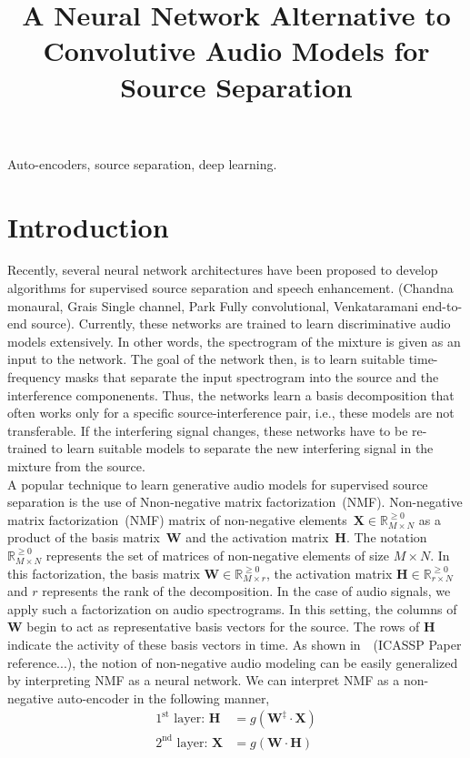 \documentclass{article}
\title{A Neural Network Alternative to Convolutive Audio Models for Source Separation}
\begin{document}
%

\maketitle
%
\begin{abstract}
\end{abstract}
%
\begin{keywords}
Auto-encoders, source separation, deep learning.
\end{keywords}
%
\section{Introduction}
\label{sec:intro}
Recently, several neural network architectures have been proposed to develop algorithms for supervised source separation and speech enhancement. (Chandna monaural, Grais Single channel, Park Fully convolutional, Venkataramani end-to-end source). Currently, these networks are trained to learn discriminative audio models extensively. In other words, the spectrogram of the mixture is given as an input to the network. The goal of the network then, is to learn suitable time-frequency masks that separate the input spectrogram into the source and the interference componenents. Thus, the networks learn a basis decomposition that often works only for a specific source-interference pair, i.e., these models are not transferable. If the interfering signal changes, these networks have to be re-trained to learn suitable models to separate the new interfering signal in the mixture from the source. \\

A popular technique to learn generative audio models for supervised source separation is the use of Nnon-negative matrix factorization~(NMF). Non-negative matrix factorization~(NMF) matrix of non-negative elements~$\mathbf{X}\in \mathbb{R}_{M\times N}^{\geq0}$ as a product of the basis matrix~$\mathbf{W}$ and the activation matrix~$\mathbf{H}$. The notation $\mathbb{R}_{M \times N}^{\geq0}$ represents the set of matrices of non-negative elements of size $M \times N$. In this factorization, the basis matrix $\mathbf{W} \in \mathbb{R}_{M \times r}^{\geq{0}}$, the activation matrix $\mathbf{H} \in \mathbb{R}_{r \times N}^{\geq{0}}$ and $r$ represents the rank of the decomposition. In the case of audio signals, we apply such a factorization on audio spectrograms. In this setting, the columns of $\mathbf{W}$ begin to act as representative basis vectors for the source. The rows of $\mathbf{H}$ indicate the activity of these basis vectors in time. As shown in~~\cite{}(ICASSP Paper reference...), the notion of non-negative audio modeling can be easily generalized by interpreting NMF as a neural network. We can interpret NMF as a non-negative auto-encoder in the following manner,
\begin{align}
    \text{$1^{\text{st}}$ layer:~}\mathbf{H} &= g(\mathbf{W^{\ddagger}} \cdot \mathbf{X}) \\
    \text{$2^{\text{nd}}$ layer:~}\mathbf{X} &= g(\mathbf{W} \cdot \mathbf{H})
    \label{eq:nmfae}
\end{align}
\end{document}
